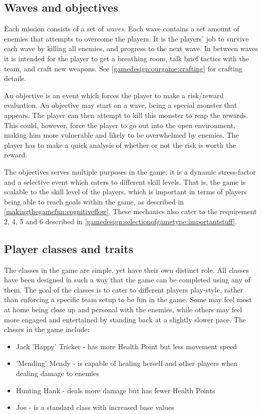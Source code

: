 \subsection{Waves and objectives}\label{gamedesign:ourgame:objectives}
Each mission consists of a set of \emph{waves}. Each wave contains a set amount of enemies that attempts to overcome the players. It is the players' job to survive each wave by killing all enemies, and progress to the next wave. In between waves it is intended for the player to get a breathing room, talk brief tactics with the team, and craft new weapons. See \ref{gamedesign:ourgame:crafting} for crafting details. 

An objective is an event which forces the player to make a risk/reward evaluation.
An objective may start on a wave, being a special monster that appears.
The player can then attempt to kill this monster to reap the rewards.
This could, however, force the player to go out into the open environment, making him more vulnerable and likely to be overwhelmed by enemies. The player has to make a quick analysis of whether or not the risk is worth the reward.

The objectives serves multiple purposes in the game; it is a dynamic
stress-factor and a selective event which caters to different skill levels.
That is, the game is scalable to the skill level of the players, which is important in terms of players being able to reach goals within the game, as described in \ref{makingthegamefun:cognitiveflow}.
These mechanics also cater to the requirement 2, 4, 5 and 6 described in \ref{gamedesign:selectionofgametype:importantstuff}.

\subsection{Player classes and traits}\label{gamedesign:ourgame:classes}
The classes in the game are simple, yet have their own distinct role.
All classes have been designed in such a way that the game can be completed using any of them.
The goal of the classes is to cater to different players play-style, rather than enforcing a specific team setup to be fun in the game.
Some may feel most at home being close up and personal with the enemies, while others may feel more engaged and entertained by standing back at a slightly slower pace.
The classes in the game include:

\begin{itemize}
\item Jack 'Happy' Tricker - has more Health Point but less movement speed
\item 'Mending' Mendy - is capable of healing herself and other players when dealing damage to enemies
\item Hunting Hank - deals more damage but has fewer Health Points
\item Joe - is a standard class with increased base values
\end{itemize}

